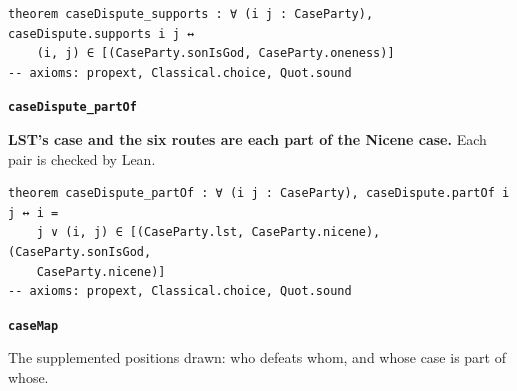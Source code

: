 \documentclass[11pt,paper=\testimonypaper,DIV=13,parskip=false]{scrartcl}
\begin{document}
{\small\begin{verbatim}
theorem caseDispute_supports : ∀ (i j : CaseParty), caseDispute.supports i j ↔
    (i, j) ∈ [(CaseParty.sonIsGod, CaseParty.oneness)]
-- axioms: propext, Classical.choice, Quot.sound
\end{verbatim}}
\par\medskip\noindent\textbf{\texttt{case\allowbreak{}Dispute\_\allowbreak{}part\allowbreak{}Of}}\par\nobreak\noindent
\textbf{LST’s case and the six routes are each part of the Nicene case.} Each pair is checked by Lean.

{\small\begin{verbatim}
theorem caseDispute_partOf : ∀ (i j : CaseParty), caseDispute.partOf i j ↔ i =
    j ∨ (i, j) ∈ [(CaseParty.lst, CaseParty.nicene), (CaseParty.sonIsGod,
    CaseParty.nicene)]
-- axioms: propext, Classical.choice, Quot.sound
\end{verbatim}}
\par\medskip\noindent\textbf{\texttt{case\allowbreak{}Map}}\par\nobreak\noindent
The supplemented positions drawn: who defeats whom, and whose case is part of whose.
\end{document}
